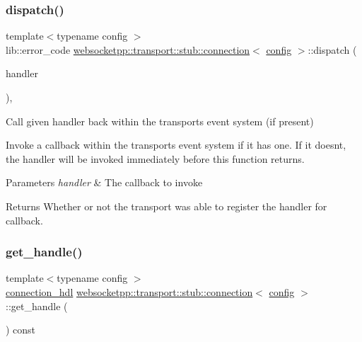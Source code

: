 \subsubsection{\texorpdfstring{dispatch()}{dispatch()}}
{\footnotesize\ttfamily template$<$typename config $>$ \\
lib\+::error\+\_\+code \mbox{\hyperlink{classwebsocketpp_1_1transport_1_1stub_1_1connection}{websocketpp\+::transport\+::stub\+::connection}}$<$ \mbox{\hyperlink{classconfig}{config}} $>$\+::dispatch (\begin{DoxyParamCaption}\item[{\mbox{\hyperlink{namespacewebsocketpp_1_1transport_a6658447b2e10f4c712dd792aad0e0c78}{dispatch\+\_\+handler}}}]{handler }\end{DoxyParamCaption})\hspace{0.3cm}{\ttfamily [inline]}, {\ttfamily [protected]}}



Call given handler back within the transport\textquotesingle{}s event system (if present) 

Invoke a callback within the transport\textquotesingle{}s event system if it has one. If it doesn\textquotesingle{}t, the handler will be invoked immediately before this function returns.


\begin{DoxyParams}{Parameters}
{\em handler} & The callback to invoke\\
\hline
\end{DoxyParams}
\begin{DoxyReturn}{Returns}
Whether or not the transport was able to register the handler for callback. 
\end{DoxyReturn}
\mbox{\label{classwebsocketpp_1_1transport_1_1stub_1_1connection_a7e21eb9d7ca9354603c9068b31d43a94}} 
\subsubsection{\texorpdfstring{get\+\_\+handle()}{get\_handle()}}
{\footnotesize\ttfamily template$<$typename config $>$ \\
\mbox{\hyperlink{namespacewebsocketpp_a6b3d26a10ee7229b84b776786332631d}{connection\+\_\+hdl}} \mbox{\hyperlink{classwebsocketpp_1_1transport_1_1stub_1_1connection}{websocketpp\+::transport\+::stub\+::connection}}$<$ \mbox{\hyperlink{classconfig}{config}} $>$\+::get\+\_\+handle (\begin{DoxyParamCaption}{ }\end{DoxyParamCaption}) const\hspace{0.3cm}{\ttfamily [inline]}}



